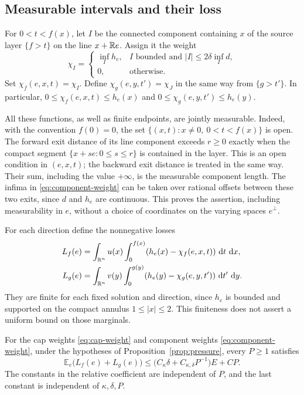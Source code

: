 \subsection{Measurable intervals and their loss}

For $0<t<f(x)$, let $I$ be the connected component containing $x$
of the source layer $\{f>t\}$ on the line $x+\mathbb R e$.  Assign it
the weight
\begin{equation}\label{eq:component-weight}
 \chi_I=
 \begin{cases}
  \displaystyle\inf_I h_e,
   &I\text{ bounded and }|I|\le2\delta\inf_I d,\\
  0,&\text{otherwise}.
 \end{cases}
\end{equation}
Set $\chi_f(e,x,t)=\chi_I$.  Define $\chi_g(e,y,t')=\chi_J$
in the same way from $\{g>t'\}$.  In particular,
$0\le\chi_f(e,x,t)\le h_e(x)$ and
$0\le\chi_g(e,y,t')\le h_e(y)$.

All these functions, as well as finite endpoints, are jointly
measurable.  Indeed, with the convention $f(0)=0$, the set
$\{(x,t):x\ne0,\ 0<t<f(x)\}$ is open.  The forward exit distance
of its line component exceeds $r\ge0$ exactly when the compact
segment $\{x+se:0\le s\le r\}$ is contained in the layer.  This
is an open condition in $(e,x,t)$; the backward exit distance is
treated in the same way.  Their sum, including the value $+\infty$,
is the measurable component length.  The infima in
\eqref{eq:component-weight} can be taken over rational offsets
between these two exits, since $d$ and $h_e$ are continuous.
This proves the assertion, including measurability in $e$, without
a choice of coordinates on the varying spaces $e^\perp$.

For each direction define the nonnegative losses
\begin{align*}
 L_f(e)&=\int_{\mathbb R^n}u(x)\int_0^{f(x)}
                 (h_e(x)-\chi_f(e,x,t))\,\,\mathrm d t\,\,\mathrm d x,\\
 L_g(e)&=\int_{\mathbb R^n}v(y)\int_0^{g(y)}
                 (h_e(y)-\chi_g(e,y,t'))\,\,\mathrm d t'\,\,\mathrm d y.
\end{align*}
They are finite for each fixed solution and direction, since $h_e$
is bounded and supported on the compact annulus $1\le|x|\le2$.
This finiteness does not assert a uniform bound on those marginals.

\begin{lemma}\label{lem:layer-loss}
For the cap weights \eqref{eq:cap-weight} and component weights
\eqref{eq:component-weight}, under the hypotheses of
Proposition~\ref{prop:pressure}, every $P\ge1$ satisfies
\begin{equation}\label{eq:layer-loss}
 \mathbb E_e\bigl(L_f(e)+L_g(e)\bigr)
 \le\bigl(C_\kappa\delta+C_{\kappa,\delta}P^{-1}\bigr)E+CP.
\end{equation}
The constants in the relative coefficient are independent of $P$,
and the last constant is independent of $\kappa,\delta,P$.
\end{lemma}

